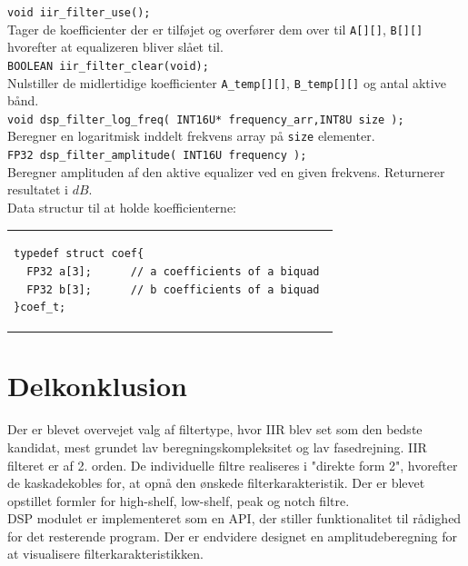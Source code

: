 \texttt{void iir\_filter\_use();} \\
Tager de koefficienter der er tilføjet og overfører dem over til \texttt{A[][]}, \texttt{B[][]} hvorefter at equalizeren bliver slået til.\\

\texttt{BOOLEAN iir\_filter\_clear(void);} \\ 
Nulstiller de midlertidige koefficienter \texttt{A\_temp[][]}, \texttt{B\_temp[][]} og antal aktive bånd. \\

\texttt{void dsp\_filter\_log\_freq( INT16U* frequency\_arr,INT8U size );} \\ 
Beregner en logaritmisk inddelt frekvens array på \texttt{size} elementer. \\

\texttt{FP32 dsp\_filter\_amplitude( INT16U frequency );}\\
Beregner amplituden af den aktive equalizer ved en given frekvens. Returnerer resultatet i $dB$. \\

Data structur til at holde koefficienterne:\\
\begin{tabular}{l}
\begin{lstlisting}
typedef struct coef{
  FP32 a[3];      // a coefficients of a biquad
  FP32 b[3];      // b coefficients of a biquad 
}coef_t;
\end{lstlisting}
\end{tabular}




\section{Delkonklusion}
Der er blevet overvejet valg af filtertype, hvor IIR blev set som den bedste kandidat, mest grundet lav beregningskompleksitet og lav fasedrejning. IIR filteret er af 2. orden. De individuelle filtre realiseres i "direkte form 2", hvorefter de kaskadekobles for, at opnå den ønskede filterkarakteristik. Der er blevet opstillet formler for high-shelf, low-shelf, peak og notch filtre.\\
DSP modulet er implementeret som en API, der stiller funktionalitet til rådighed for det resterende program. Der er endvidere designet en amplitudeberegning for at visualisere filterkarakteristikken.
